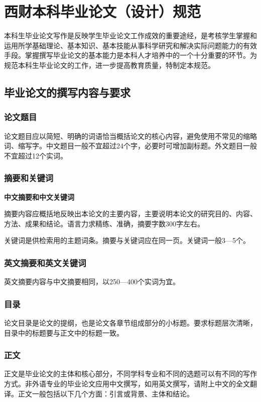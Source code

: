 \section{西财本科毕业论文（设计）规范}
本科生毕业论文写作是反映学生毕业论文工作成效的重要途经，是考核学生掌握和运用所学基础理论、基本知识、基本技能从事科学研究和解决实际问题能力的有效手段。掌握撰写毕业论文的基本能力是本科人才培养中的一个十分重要的环节。为规范本科生毕业论文的工作，进一步提高教育质量，特制定本规范。

\subsection{毕业论文的撰写内容与要求}
\subsubsection{论文题目}
论文题目应以简短、明确的词语恰当概括论文的核心内容，避免使用不常见的缩略词、缩写字。中文题目一般不宜超过24个字，必要时可增加副标题。外文题目一般不宜超过12个实词。
\subsubsection{摘要和关键词}
\textbf{中文摘要和中文关键词}

摘要内容应概括地反映出本论文的主要内容，主要说明本论文的研究目的、内容、方法、成果和结论。语言力求精练、准确，摘要字数300字左右。

关键词是供检索用的主题词条。摘要与关键词应在同一页。关键词一般3—5个。

\subsubsection{英文摘要和英文关键词}
英文摘要内容与中文摘要相同，以250—400个实词为宜。

\subsubsection{目录}
论文目录是论文的提纲，也是论文各章节组成部分的小标题。要求标题层次清晰，目录中的标题要与正文中的标题一致。

\subsubsection{正文}

正文是毕业论文的主体和核心部分，不同学科专业和不同的选题可以有不同的写作方式。非外语专业的毕业论文应用中文撰写，如用英文撰写，请附上中文的全文翻译。正文一般包括以下几个方面：引言或背景、主体和结论。

